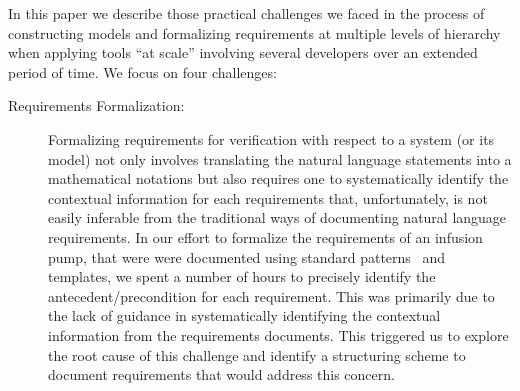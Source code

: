 In this paper we describe those practical challenges we faced in the process of constructing models and formalizing requirements at multiple levels of hierarchy when applying tools ``at scale'' involving several developers over an extended period of time.  We focus on four challenges:
\begin{description}
        \item[Requirements Formalization:] Formalizing requirements for verification with respect to a system (or its model) not only involves translating the natural language statements into a mathematical notations but also requires one to systematically identify the contextual information for each requirements that, unfortunately, is not easily inferable from the traditional ways of documenting natural language requirements. In our effort to formalize the requirements of an infusion pump, that were were documented using standard patterns~\cite{mavin2009easy} and templates, we spent a number of hours to precisely identify the antecedent/precondition for each requirement. This was primarily due to the lack of guidance in systematically identifying the contextual information from the requirements documents. This  triggered us to explore the root cause of this challenge and  identify a structuring scheme to document requirements that would address this concern.


\end{description}
